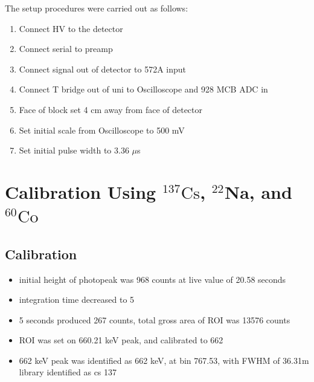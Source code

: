 \documentclass[a4paper]{article}
\begin{document}
The setup procedures were carried out as follows:
\begin{enumerate}
\item Connect HV to the detector
\item Connect serial to preamp
\item Connect signal out of detector to 572A input
\item Connect T bridge out of uni to Oscilloscope and 928 MCB ADC in
\item Face of block set 4 cm away from face of detector
\item Set initial scale from Oscilloscope to 500 mV
\item Set initial pulse width to 3.36 $\mu$s
\end{enumerate}
\section{Calibration Using $^{137}\mathrm{Cs}$, $^{22}\mathbf{Na}$, and $^{60}\mathrm{Co}$}
\subsection{Calibration}
\begin{itemize}
    \item initial height of photopeak was 968 counts at live value of 20.58 seconds
    \item integration time decreased to 5
    \item 5 seconds produced 267 counts, total gross area of ROI was 13576 counts
    \item ROI was set on 660.21 keV peak, and calibrated to 662
    \item 662 keV peak was identified as 662 keV, at bin 767.53, with FWHM of 36.31m library identified as cs 137
\end{itemize}
\end{document}
